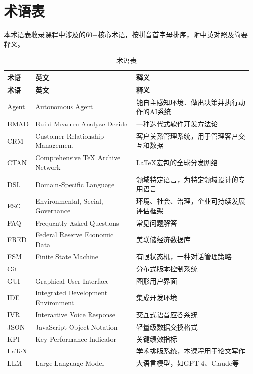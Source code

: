 
\chapter{术语表}

本术语表收录课程中涉及的60+核心术语，按拼音首字母排序，附中英对照及简要释义。

\begin{longtable}{lp{2.5cm}p{7cm}}
\caption{术语表} \\
\toprule
\textbf{术语} & \textbf{英文} & \textbf{释义} \\
\midrule
\endfirsthead
\toprule
\textbf{术语} & \textbf{英文} & \textbf{释义} \\
\midrule
\endhead
\bottomrule
\endfoot
Agent & Autonomous Agent & 能自主感知环境、做出决策并执行动作的AI系统 \\
BMAD & Build-Measure-Analyze-Decide & 一种迭代式软件开发方法论 \\
CRM & Customer Relationship Management & 客户关系管理系统，用于管理客户交互和数据 \\
CTAN & Comprehensive TeX Archive Network & LaTeX宏包的全球分发网络 \\
DSL & Domain-Specific Language & 领域特定语言，为特定领域设计的专用语言 \\
ESG & Environmental, Social, Governance & 环境、社会、治理，企业可持续发展评估框架 \\
FAQ & Frequently Asked Questions & 常见问题解答 \\
FRED & Federal Reserve Economic Data & 美联储经济数据库 \\
FSM & Finite State Machine & 有限状态机，一种对话管理策略 \\
Git & --- & 分布式版本控制系统 \\
GUI & Graphical User Interface & 图形用户界面 \\
IDE & Integrated Development Environment & 集成开发环境 \\
IVR & Interactive Voice Response & 交互式语音应答系统 \\
JSON & JavaScript Object Notation & 轻量级数据交换格式 \\
KPI & Key Performance Indicator & 关键绩效指标 \\
LaTeX & --- & 学术排版系统，本课程用于论文写作 \\
LLM & Large Language Model & 大语言模型，如GPT-4、Claude等 \\

\end{longtable}
